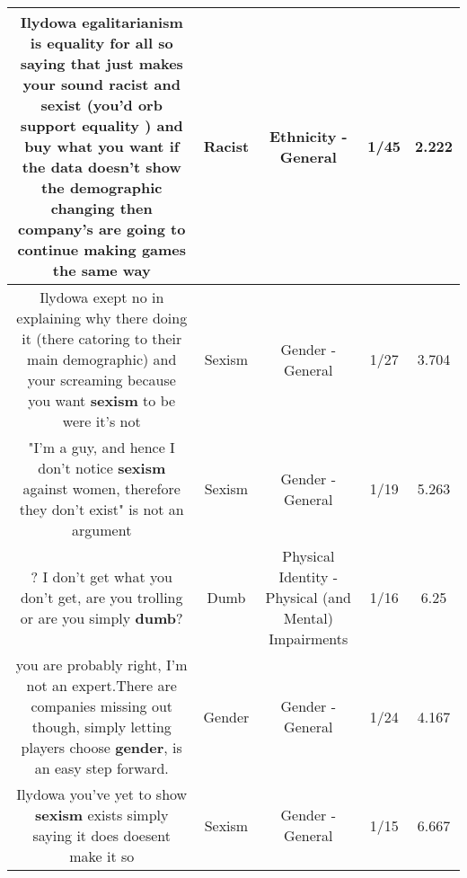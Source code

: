 \documentclass[11pt]{article}
\newlength\mylength
\begin{document}
\begin{center}
\begin{longtable}{|C{.65\mylength}|C{.30\mylength}|C{.12\mylength}|C{.12\mylength}|C{.12\mylength}|}
  \small Ilydowa egalitarianism is equality for all so saying that just makes your sound \textbf{racist} and sexist (you'd orb support equality ) and buy what you want if the data doesn't show the demographic changing then company's are going to continue making games the same way\normalsize   & Racist & Ethnicity - General & 1/45 & 2.222 \\  \hline
  \small Ilydowa exept no in explaining why there doing it (there catoring to their main demographic) and your screaming because you want \textbf{sexism} to be were it's not\normalsize   & Sexism & Gender - General & 1/27 & 3.704 \\  \hline
  \small "I'm a guy, and hence I don't notice \textbf{sexism} against women, therefore they don't exist" is not an argument\normalsize   & Sexism & Gender - General & 1/19 & 5.263 \\  \hline
  \small ? I don't get what you don't get, are you trolling or are you simply \textbf{dumb}?\normalsize   & Dumb & Physical Identity - Physical (and Mental) Impairments & 1/16 & 6.25 \\  \hline
  \small you are probably right, I'm not an expert.There are companies missing out though, simply letting players choose \textbf{gender}, is an easy step forward.\normalsize   & Gender & Gender - General & 1/24 & 4.167 \\  \hline
  \small Ilydowa you've yet to show \textbf{sexism} exists simply saying it does doesent make it so\normalsize   & Sexism & Gender - General & 1/15 & 6.667 \\  \hline

\end{longtable}
\end{center}
\end{document}
